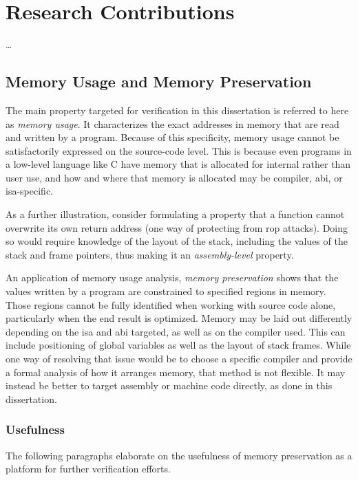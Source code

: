 \section{Research Contributions}
\todo\dots

\subsection{Memory Usage and Memory Preservation}\label{memory_usage}
The main property targeted for verification in this dissertation
is referred to here as \emph{memory usage}.%
It characterizes the exact addresses in memory that are read and written by a program.
Because of this specificity, memory usage cannot be satisfactorily expressed
on the source-code level.
This is because even programs in a low-level language like C
have memory that is allocated for internal rather than user use,
and how and where that memory is allocated may be compiler, \ac{abi},
or \ac{isa}-specific.

As a further illustration,
consider formulating a property
that a function cannot overwrite its own return address
(one way of protecting from \ac{rop} attacks).
Doing so would require knowledge of the layout of the stack,
including the values of the stack and frame pointers,
thus making it an \emph{assembly-level} property.

An application of memory usage analysis,
\emph{memory preservation} shows that the values written by a program%
are constrained to specified regions in memory.
Those regions cannot be fully identified when working with source code alone,
particularly when the end result is optimized.
Memory may be laid out differently depending on the \ac{isa} and \ac{abi} targeted,
as well as on the compiler used.
This can include positioning of global variables
as well as the layout of stack frames.
While one way of resolving that issue would be to choose a specific compiler
and provide a formal analysis of how it arranges memory, that method is not flexible.
It may instead be better to target assembly or machine code directly,
as done in this dissertation.

\subsubsection{Usefulness}
The following paragraphs elaborate on the usefulness of memory preservation
as a platform for further verification efforts.

